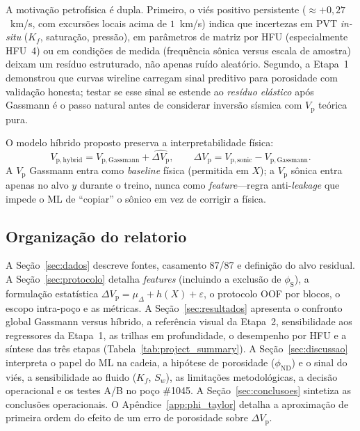 \documentclass[11pt,a4paper]{article}
\numberwithin{equation}{section}
\newcommand{\Vp}{\ensuremath{V_{\mathrm{p}}}}
\newcommand{\phiND}{\ensuremath{\phi_{\mathrm{ND}}}}
\newcommand{\phiS}{\ensuremath{\phi_{\mathrm{S}}}}
\begin{document}
A motivação petrofísica é dupla.
Primeiro, o viés positivo persistente ($\approx +0{,}27$~km/s, com excursões
locais acima de $1$~km/s) indica que
incertezas em PVT \emph{in-situ} ($K_f$, saturação, pressão), em
parâmetros de matriz por HFU (especialmente HFU~4) ou em condições de
medida (frequência sônica versus escala de amostra) deixam um resíduo
estruturado, não apenas ruído aleatório.
Segundo, a Etapa~1 demonstrou que curvas wireline carregam sinal preditivo para
porosidade com validação honesta; testar se esse sinal se estende ao
\emph{resíduo elástico} após Gassmann é o passo natural antes de
considerar inversão sísmica com \Vp{} teórica pura.

O modelo híbrido proposto preserva a interpretabilidade física:
\begin{equation}
  V_{\mathrm{p,hybrid}} = V_{\mathrm{p,Gassmann}} + \widehat{\Delta V_{\mathrm{p}}},
  \qquad
  \Delta V_{\mathrm{p}} = V_{\mathrm{p,sonic}} - V_{\mathrm{p,Gassmann}}.
  \label{eq:hybrid}
\end{equation}
A \Vp{} Gassmann entra como \emph{baseline} física (permitida em $X$); a
\Vp{} sônica entra apenas no alvo $y$ durante o treino, nunca como
\emph{feature}---regra anti-\emph{leakage} que impede o ML de ``copiar'' o
sônico em vez de corrigir a física.

\subsection{Organização do relatorio}

A Seção~\ref{sec:dados} descreve fontes, casamento 87/87 e definição
do alvo residual.
A Seção~\ref{sec:protocolo} detalha \emph{features} (incluindo a exclusão
de \phiS{}), a formulação estatística $\Delta V_{\mathrm{p}}=\mu_{\Delta}+h(X)+\varepsilon$,
o protocolo OOF por blocos, o escopo intra-poço e as métricas.
A Seção~\ref{sec:resultados} apresenta o confronto global Gassmann versus
híbrido, a referência visual da Etapa~2, sensibilidade aos regressores da
Etapa~1, as trilhas em profundidade, o desempenho por HFU e a síntese das
três etapas (Tabela~\ref{tab:project_summary}).
A Seção~\ref{sec:discussao} interpreta o papel do ML na cadeia, a hipótese
de porosidade (\phiND{}) e o sinal do viés, a sensibilidade ao fluido
($K_f$, $S_w$), as limitações metodológicas,
a decisão operacional e os testes A/B no poço \#1045.
A Seção~\ref{sec:conclusoes} sintetiza as conclusões operacionais.
O Apêndice~\ref{app:phi_taylor} detalha a aproximação de primeira ordem
do efeito de um erro de porosidade sobre $\Delta V_{\mathrm{p}}$.
\end{document}
